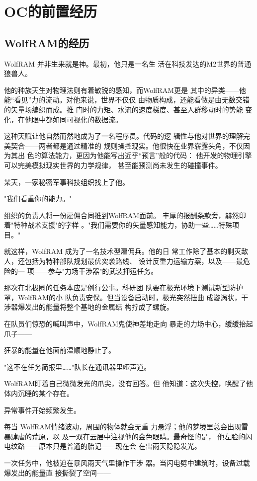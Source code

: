 \documentclass[lang=cn,newtx,10pt,scheme=chinese]{elegantbook}
\newcommand{\wf}{WolfRAM}
\begin{document}
\section{OC的前置经历}
\subsection{\wf{}的经历}
\wf{} 并非生来就是神。最初，他只是一名生
活在科技发达的M2世界的普通狼兽人。

他的种族天生对物理法则有着敏锐的感知，而\wf{}更是
其中的异类——他能“看见”力的流动。对他来说，世界不仅仅
由物质构成，还能看做是由无数交错的矢量场编织而成。推
门时的力矩、水流的速度梯度、甚至人群移动时的势能
变化，在他眼中都如同可视化的数据流。

这种天赋让他自然而然地成为了一名程序员。代码的逻
辑性与他对世界的理解完美契合——两者都是通过精准的
规则操控现实。他很快在业界崭露头角，不仅因为其出
色的算法能力，更因为他能写出近乎“预言”般的代码：
他开发的物理引擎可以完美模拟现实世界的力学规律，
甚至能预测尚未发生的碰撞事件。

某天，一家秘密军事科技组织找上了他。

"我们看重你的能力。"

组织的负责人将一份雇佣合同推到\wf{}面前。
丰厚的报酬条款旁，赫然印着"特种战术支援"的字样
。"我们需要你的矢量感知能力，协助一些……特殊项目。"

就这样，\wf{} 成为了一名技术型雇佣兵。他的日
常工作除了基本的剿灭敌人，还包括为特种部队规划最优突袭路线、
设计反重力运输方案，以及——最危险的一
项——参与"力场干涉器"的武装押运任务。

那次在北极圈的任务本应是例行公事。科研团
队要在极光环境下测试新型防护罩，\wf{}的小
队负责安保。但当设备启动时，极光突然扭曲
成漩涡状，干涉器爆发出的能量将整个基地的金属结
构拧成了螺旋。

在队员们惊恐的喊叫声中，\wf{}鬼使神差地走向
暴走的力场中心，缓缓抬起爪子——

狂暴的能量在他面前温顺地静止了。

"这不在任务简报里……"队长在通讯器里哑声道。

\wf{}盯着自己微微发光的爪尖，没有回答。但
他知道：这次失控，唤醒了他体内沉睡的某个存在。

异常事件开始频繁发生。

每当 \wf{}情绪波动，周围的物体就会无重
力悬浮；他的梦境里总会出现雷暴肆虐的荒原，以
及一双在云层中注视他的金色眼睛。最奇怪的是，
他左脸的闪电纹路——原本只是普通的胎记——现在会
在雷雨天隐隐发光。

一次任务中，他被迫在暴风雨天气里操作干涉
器。当闪电劈中建筑时，设备过载爆发出的能量直
接撕裂了空间——
\end{document}
